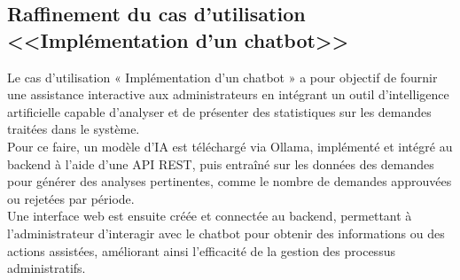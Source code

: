 \subsection{Raffinement du cas d'utilisation <<Implémentation d’un chatbot>>}
Le cas d’utilisation « Implémentation d’un chatbot » a pour objectif de fournir une assistance interactive aux administrateurs en intégrant un outil d’intelligence artificielle capable d’analyser et de présenter des statistiques sur les demandes traitées dans le système.\\
Pour ce faire, un modèle d’IA est téléchargé via Ollama, implémenté et intégré au backend à l’aide d’une API REST, puis entraîné sur les données des demandes pour générer des analyses pertinentes, comme le nombre de demandes approuvées ou rejetées par période.\\
Une interface web est ensuite créée et connectée au backend, permettant à l’administrateur d’interagir avec le chatbot pour obtenir des informations ou des actions assistées, améliorant ainsi l’efficacité de la gestion des processus administratifs.
\newpage
